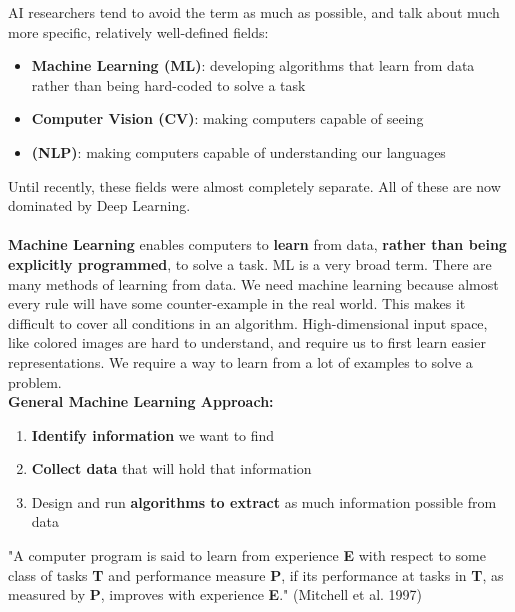 AI researchers tend to avoid the term as much as possible, and talk about much more specific, relatively well-defined fields:
\begin{itemize}
    \item \textbf{Machine Learning (ML)}: developing algorithms that learn from data rather than being hard-coded to solve a task
    \item \textbf{Computer Vision (CV)}: making computers capable of seeing
    \item \textbf{ (NLP)}: making computers capable of understanding our languages

\end{itemize}
Until recently, these fields were almost completely separate. All of these are now dominated by Deep Learning.\\
\\\textbf{Machine Learning} enables computers to \textbf{learn} from data, \textbf{rather than being explicitly programmed}, to solve a task. ML is a very broad term. There are many methods of learning from data. We need machine learning because almost every rule will have some counter-example in the real world. This makes it difficult to cover all conditions in an algorithm. High-dimensional input space, like colored images are hard to understand, and require us to first learn easier representations. We require a way to learn from a lot of examples to solve a problem.\\

\textbf{General Machine Learning Approach:}
\begin{enumerate}
    \item \textbf{Identify information} we want to find
    \item \textbf{Collect data} that will hold that information
    \item Design and run \textbf{algorithms to extract} as much information possible from data
\end{enumerate}

\begin{idea}
"A computer program is said to learn from experience \textbf{E} with respect to
some class of tasks \textbf{T} and performance measure \textbf{P}, if its performance at tasks
in \textbf{T}, as measured by \textbf{P}, improves with experience\textbf{ E}." (Mitchell et al. 1997)
\end{idea}
